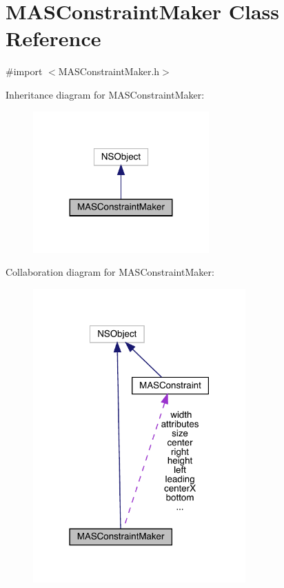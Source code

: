 \hypertarget{interface_m_a_s_constraint_maker}{}\section{M\+A\+S\+Constraint\+Maker Class Reference}
\label{interface_m_a_s_constraint_maker}


{\ttfamily \#import $<$M\+A\+S\+Constraint\+Maker.\+h$>$}



Inheritance diagram for M\+A\+S\+Constraint\+Maker\+:\nopagebreak
\begin{figure}[H]
\begin{center}
\leavevmode
\includegraphics[width=191pt]{interface_m_a_s_constraint_maker__inherit__graph}
\end{center}
\end{figure}


Collaboration diagram for M\+A\+S\+Constraint\+Maker\+:\nopagebreak
\begin{figure}[H]
\begin{center}
\leavevmode
\includegraphics[width=231pt]{interface_m_a_s_constraint_maker__coll__graph}
\end{center}
\end{figure}
